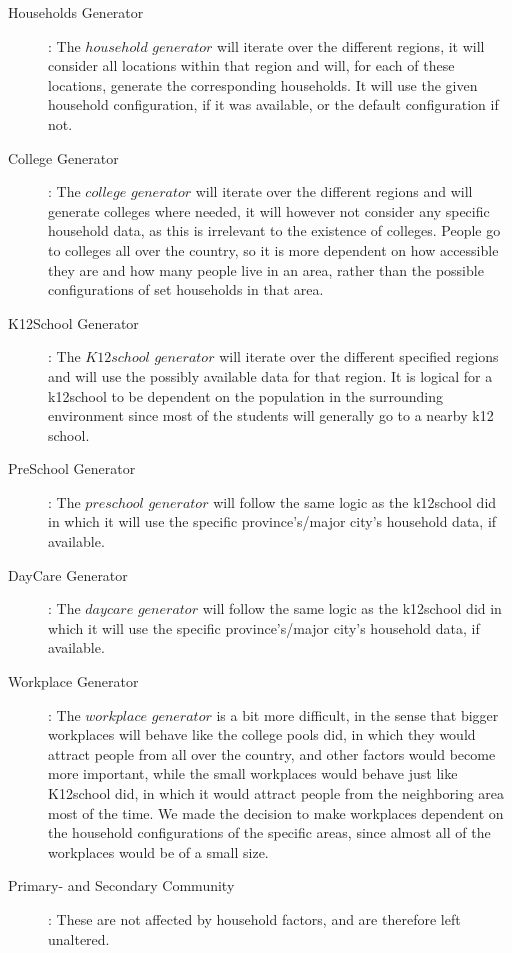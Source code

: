 \begin{description}
	\item[Households Generator]: 
		The $household$ $generator$ will iterate over the different regions, it will consider all locations within that region and will, for each of these locations, generate the corresponding households. It will use the given household configuration, if it was available, or the default configuration if not.
		
	\item[College Generator]:
		The $college$ $generator$ will iterate over the different regions and will generate colleges where needed, it will however not consider any specific household data, as this is irrelevant to the existence of colleges. People go to colleges all over the country, so it is more dependent on how accessible they are and how many people live in an area, rather than the possible configurations of set households in that area.
		
	\item[K12School Generator]:
		The $K12school$ $generator$ will iterate over the different specified regions and will use the possibly available data for that region. It is logical for a k12school to be dependent on the population in the surrounding environment since most of the students will generally go to a nearby k12 school. 
		
	\item[PreSchool Generator]:
		The $preschool$ $generator$ will follow the same logic as the k12school did in which it will use the specific province's/major city's household data, if available.
		
	\item[DayCare Generator]:
		The $daycare$ $generator$ will follow the same logic as the k12school did in which it will use the specific province's/major city's household data, if available.
		
	\item[Workplace Generator]:
		The $workplace$ $generator$ is a bit more difficult, in the sense that bigger workplaces will behave like the college pools did, in which they would attract people from all over the country, and other factors would become more important, while the small workplaces would behave just like K12school did, in which it would attract people from the neighboring area most of the time. We made the decision to make workplaces dependent on the household configurations of the specific areas, since almost all of the workplaces would be of a small size.
		
	\item[Primary- and Secondary Community]:
		These are not affected by household factors, and are therefore left unaltered.
\end{description}

